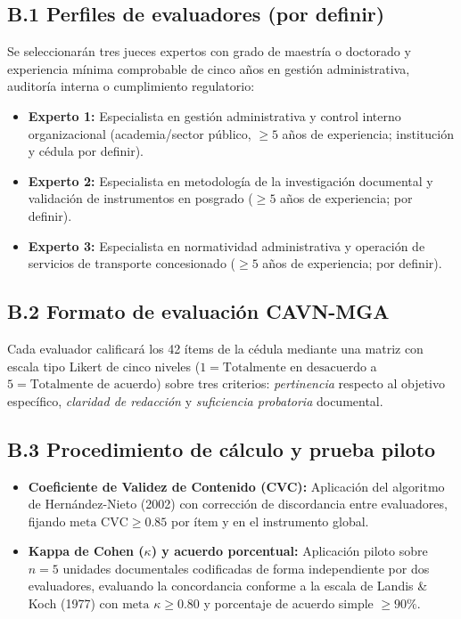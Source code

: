 {\subsection*{B.1 Perfiles de evaluadores (por definir)}
Se seleccionarán tres jueces expertos con grado de maestría o doctorado y experiencia mínima comprobable de cinco años en gestión administrativa, auditoría interna o cumplimiento regulatorio:
\begin{itemize}
    \item \textbf{Experto 1:} Especialista en gestión administrativa y control interno organizacional (academia/sector público, $\ge 5$ años de experiencia; institución y cédula por definir).
    \item \textbf{Experto 2:} Especialista en metodología de la investigación documental y validación de instrumentos en posgrado ($\ge 5$ años de experiencia; por definir).
    \item \textbf{Experto 3:} Especialista en normatividad administrativa y operación de servicios de transporte concesionado ($\ge 5$ años de experiencia; por definir).
\end{itemize}

\subsection*{B.2 Formato de evaluación CAVN-MGA}
Cada evaluador calificará los 42 ítems de la cédula mediante una matriz con escala tipo Likert de cinco niveles ($1 = \text{Totalmente en desacuerdo}$ a $5 = \text{Totalmente de acuerdo}$) sobre tres criterios: \textit{pertinencia} respecto al objetivo específico, \textit{claridad de redacción} y \textit{suficiencia probatoria} documental.

\subsection*{B.3 Procedimiento de cálculo y prueba piloto}
\begin{itemize}
    \item \textbf{Coeficiente de Validez de Contenido (CVC):} Aplicación del algoritmo de Hernández-Nieto (2002) con corrección de discordancia entre evaluadores, fijando $\text{meta CVC} \ge 0.85$ por ítem y en el instrumento global.
    \item \textbf{Kappa de Cohen ($\kappa$) y acuerdo porcentual:} Aplicación piloto sobre $n = 5$ unidades documentales codificadas de forma independiente por dos evaluadores, evaluando la concordancia conforme a la escala de Landis \& Koch (1977) con $\text{meta }\kappa \ge 0.80$ y porcentaje de acuerdo simple $\ge 90\%$.
\end{itemize}

}
